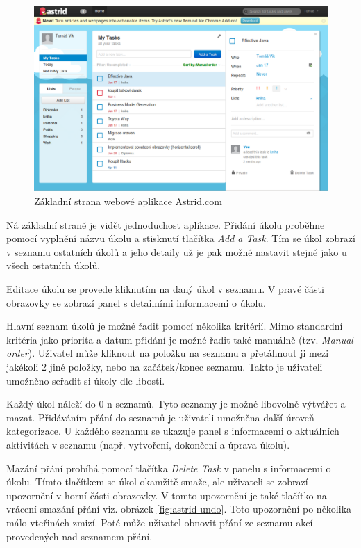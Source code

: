 \begin{figure}[htb]
\begin{center}
\includegraphics[width=130mm]{./pictures/astrid.png}
\caption{Základní strana webové aplikace Astrid.com}
\label{fig:astrid}
\end{center}
\end{figure}

Ná základní straně je vidět jednoduchost aplikace. Přidání úkolu proběhne pomocí vyplnění názvu úkolu a stisknutí tlačítka \emph{Add a Task}. Tím se úkol zobrazí v seznamu ostatních úkolů a jeho detaily už je pak možné nastavit stejně jako u všech ostatních úkolů.

Editace úkolu se provede kliknutím na daný úkol v seznamu. V pravé části obrazovky se zobrazí panel s detailními informacemi o úkolu.

Hlavní seznam úkolů je možné řadit pomocí několika kritérií. Mimo standardní kritéria jako priorita a datum přidání je možné řadit také manuálně (tzv. \emph{Manual order}). Uživatel může kliknout na položku na seznamu a přetáhnout ji mezi jakékoli 2 jiné položky, nebo na začátek/konec seznamu. Takto je uživateli umožněno seřadit si úkoly dle libosti.

Každý úkol náleží do 0-n seznamů. Tyto seznamy je možné libovolně výtvářet a mazat. Přidáváním přání do seznamů je uživateli umožněna další úroveň kategorizace. U každého seznamu se ukazuje panel s informacemi o aktuálních aktivitách v seznamu (např. vytvoření, dokončení a úprava úkolu).

Mazání přání probíhá pomocí tlačítka \emph{Delete Task} v panelu s informacemi o úkolu. Tímto tlačítkem se úkol okamžitě smaže, ale uživateli se zobrazí upozornění v horní části obrazovky. V tomto upozornění je také tlačítko na vrácení smazání přání viz. obrázek \ref{fig:astrid-undo}. Toto upozornění po několika málo vteřinách zmizí. Poté může uživatel obnovit přání ze seznamu akcí provedených nad seznamem přání.

